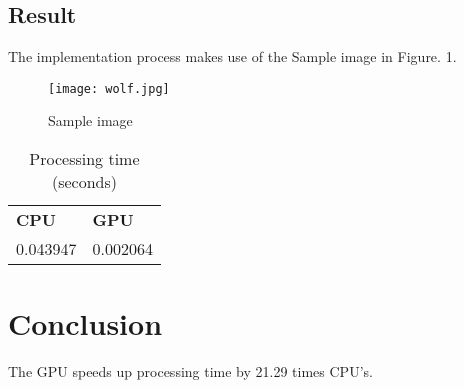 \documentclass{article}
\begin{document}
    \subsection{Result}
        The implementation process makes use of the Sample image in Figure. 1.
        \begin{figure}
            \centering
            \texttt{[image: wolf.jpg]}
            \caption{Sample image}
            \label{fig:enter-label}
        \end{figure}

        \begin{table}[ht]
            \centering
            \begin{tabular}{@{}ll@{}}
                \textbf{CPU} & \textbf{GPU} \\
                0.043947     & 0.002064     \\
            \end{tabular}
            \caption{Processing time (seconds)}
            \label{tab:sample_table}
        \end{table}

        
\section{Conclusion}
    
    The GPU speeds up processing time by 21.29 times CPU's.
\end{document}
